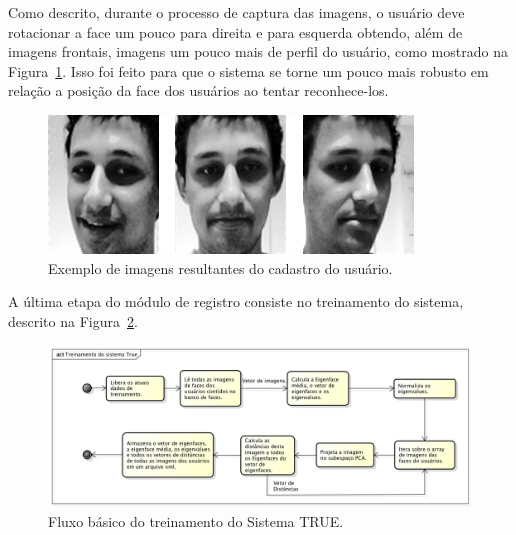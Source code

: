 	Como descrito, durante o processo de captura das imagens, o usuário deve rotacionar a face um pouco para direita e para esquerda obtendo, além de imagens frontais, imagens um pouco mais de perfil do usuário, como mostrado na Figura~\ref{fig:imgs-cadastro}. Isso foi feito para que o sistema se torne um pouco mais robusto em relação a posição da face dos usuários ao tentar reconhece-los.

		\begin{figure}[htb]
			\begin{center}
				\includegraphics[scale=0.4]{figuras/4.ProblemaEProposta/face-registro.png}
			\end{center}
			\caption{Exemplo de imagens resultantes do cadastro do usuário.}
			\label{fig:imgs-cadastro}
		\end{figure}	

	A última etapa do módulo de registro consiste no treinamento do sistema, descrito na Figura~\ref{fig:treinamento}.

		\begin{figure}[htb]
			\begin{center}
				\includegraphics[scale=0.5]{figuras/4.ProblemaEProposta/diagrama-registro.png}
			\end{center}
			\caption{Fluxo básico do treinamento do Sistema TRUE.}
			\label{fig:treinamento}
		\end{figure}	